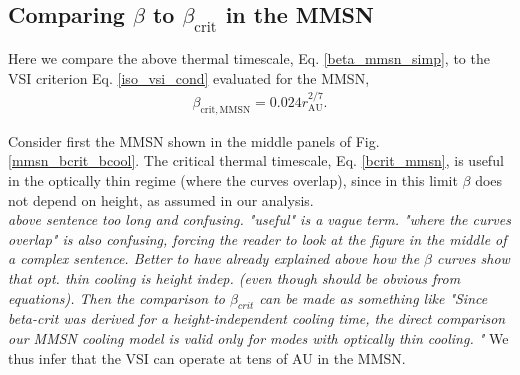 \subsection{Comparing $\beta$ to $\beta_\mathrm{crit}$ in the MMSN} 
Here we compare the above thermal timescale, Eq. \ref{beta_mmsn_simp}, to  
the VSI criterion Eq. \ref{iso_vsi_cond} evaluated for the MMSN,     
\begin{align}\label{bcrit_mmsn}
  \beta_\mathrm{crit,MMSN} = 0.024r_\mathrm{AU}^{2/7}. 
\end{align}






Consider first the MMSN shown in the middle panels of 
Fig. \ref{mmsn_bcrit_bcool}. The critical thermal timescale,
Eq. \ref{bcrit_mmsn}, is useful in the optically thin regime (where the
curves overlap), since in this limit $\beta$ does not depend on
height, as assumed in our analysis. \\
\emph{above sentence too long and confusing.  "useful" is a vague term.  
"where the curves overlap" is also confusing, forcing the reader to look at the figure in the middle of a complex sentence.  Better to have already explained above how the $\beta$ curves show that opt. thin cooling is height indep. (even though should be obvious from equations).  Then the comparison to $\beta_{crit}$ can be made as something like "Since beta-crit was derived for a height-independent cooling time,  the direct comparison our MMSN cooling model is valid only for modes with optically thin cooling. "} 
We thus infer that the VSI can
operate at tens of AU in the MMSN.  

